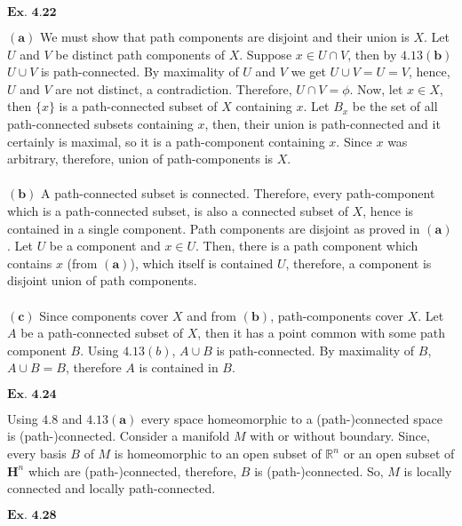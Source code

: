 \documentclass{article}
\begin{document}
${\textbf{Ex. 4.22}}$

$\mathbf{(a)}$ We must show that path components are disjoint and their union is $X$. Let $U$ and $V$ be distinct path components of $X$. Suppose $x \in U \cap V$, then by $\mathbf{4.13 (b)}$ $U \cup V$ is path-connected. By maximality of $U$ and $V$ we get $U \cup V = U = V$, hence, $U$ and $V$ are not distinct, a contradiction. Therefore, $U \cap V = \phi$. Now, let $x \in X$, then $\{x\}$ is a path-connected subset of $X$ containing $x$. Let $B_x$ be the set of all path-connected subsets containing $x$, then, their union is path-connected and it certainly is maximal, so it is a path-component containing $x$. Since $x$ was arbitrary, therefore, union of path-components is $X$.\\~\\

$\mathbf{(b)}$ A path-connected subset is connected. Therefore, every path-component which is a path-connected subset, is also a connected subset of $X$, hence is contained in a single component. Path components are disjoint as proved in $\mathbf{(a)}$. Let $U$ be a component and $x \in U$. Then, there is a path component which contains $x$ (from $\mathbf{(a)}$), which itself is contained $U$, therefore, a component is disjoint union of path components.\\~\\

$\mathbf{(c)}$ Since components cover $X$ and from $\mathbf{(b)}$, path-components cover $X$. Let $A$ be a path-connected subset of $X$, then it has a point common with some path component $B$. Using $4.13(b)$, $A \cup B$ is path-connected. By maximality of $B$, $A\cup B = B$, therefore $A$ is contained in $B$.

\vspace{0.2in}

${\textbf{Ex. 4.24}}$

Using $\mathbf{4.8}$ and $\mathbf{4.13(a)}$ every space homeomorphic to a (path-)connected space is (path-)connected. Consider a manifold $M$ with or without boundary. Since, every basis $B$ of $M$ is homeomorphic to an open subset of $\mathbb{R}^n$ or an open subset of $\mathbf{H}^n$ which are (path-)connected, therefore, $B$ is (path-)connected. So, $M$ is locally connected and locally path-connected.

\vspace{0.2in}

${\textbf{Ex. 4.28}}$
\end{document}
